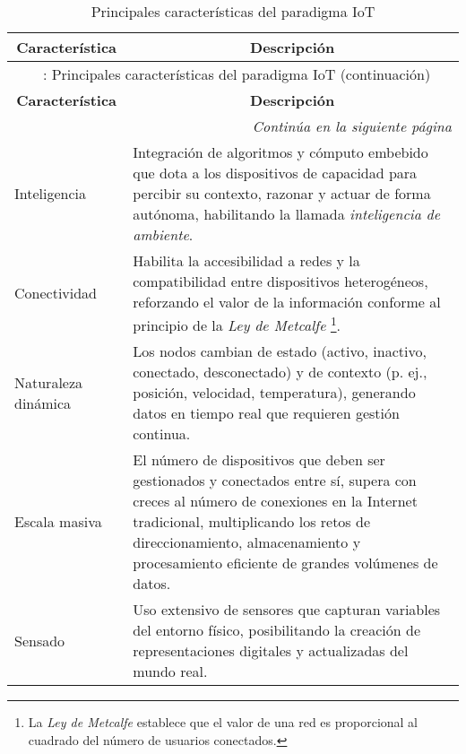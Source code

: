\begin{longtable}{l|p{10cm}}
    \caption{Principales características del paradigma IoT} \label{tab:iot_characteristics} \\
    \hline
    \multicolumn{1}{c|}{\textbf{Característica}} & \multicolumn{1}{c}{\textbf{Descripción}} \\
    \hline
    \endfirsthead
    
    \multicolumn{2}{c}{\tablename\ \thetable{}: Principales características del paradigma IoT (continuación)} \\
    \hline
    \multicolumn{1}{c|}{\textbf{Característica}} & \multicolumn{1}{c}{\textbf{Descripción}} \\
    \hline
    \endhead
    
    \hline
    \multicolumn{2}{r}{\textit{Continúa en la siguiente página}} \\
    \endfoot
    
    \hline
    \endlastfoot
    
    Inteligencia & Integración de algoritmos y cómputo embebido que dota a los dispositivos de capacidad para percibir su contexto, razonar y actuar de forma autónoma, habilitando la llamada \textit{inteligencia de ambiente}.\\
    \hline

    Conectividad & Habilita la accesibilidad a redes y la compatibilidad entre dispositivos heterogéneos, reforzando el valor de la información conforme al principio de la \textit{Ley de Metcalfe} \footnote{La \textit{Ley de Metcalfe} establece que el valor de una red es proporcional al cuadrado del número de usuarios conectados.}. \\
    \hline

    Naturaleza dinámica & Los nodos cambian de estado (activo, inactivo, conectado, desconectado) y de contexto (p. ej., posición, velocidad, temperatura), generando datos en tiempo real que requieren gestión continua.\\
    \hline

    Escala masiva & El número de dispositivos que deben ser gestionados y conectados entre sí, supera con creces al número de conexiones en la Internet tradicional, multiplicando los retos de direccionamiento, almacenamiento y procesamiento eficiente de grandes volúmenes de datos.\\
    \hline

    Sensado & Uso extensivo de sensores que capturan variables del entorno físico, posibilitando la creación de representaciones digitales y actualizadas del mundo real. \\
    \hline


\end{longtable}
